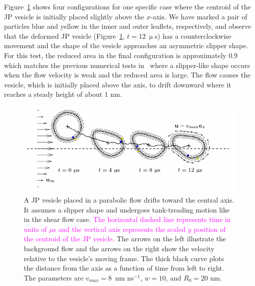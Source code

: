 \documentclass[lineno]{jfm}
\newcommand{\ReviewerThree}[1]{\textcolor{magenta}{#1}}
\begin{document}

Figure~\ref{figure6} shows four configurations for one specific case
where the centroid of the JP vesicle is initially placed slightly above
the $x$-axis. We have marked a pair of particles blue and yellow in the
inner and outer leaflets, respectively, and observe that the deformed JP
vesicle (Figure~\ref{figure6}, $t = 12~\upmu$s) has a counterclockwise
movement and the shape of the vesicle approaches an asymmetric slipper
shape. For this test, the reduced area in the final configuration is
approximately $0.9$ which matches the previous numerical tests
in~\cite{Kaoui09} where a slipper-like shape occurs when the flow
velocity is weak and the reduced area is large. The flow causes the
vesicle, which is initially placed above the axis, to drift downward
where it reaches a steady height of about $1$ nm. 

\begin{figure}
\centering
\includegraphics[width=\textwidth]{Figure6_Wrapper.pdf}
  \caption{\label{figure6} A JP vesicle placed in a parabolic flow
  drifts toward the central axis. It assumes a slipper shape and
  undergoes tank-treading motion like in the shear flow case. 
 \ReviewerThree{The horizontal dashed line represents time in units of $\mu$s and the vertical axis represents the scaled $y$ position of the centroid of the JP vesicle.}
  The arrows
  on the left illustrate the background flow and the arrows on the right
  show the velocity relative to the vesicle's moving frame. The thick
  black curve plots the distance from the axis as a function of time
  from left to right. The parameters are $v_{max} = 8$~nm ns$^{-1}$,
  $w=10$, and $R_0=20$ nm.}
\end{figure}
\end{document}
